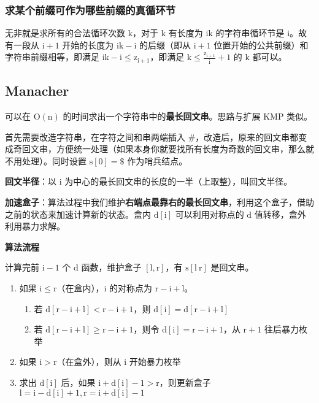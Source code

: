 \documentclass[UTF8]{article}
\begin{document}
\subsubsection{求某个前缀可作为哪些前缀的真循环节}
无非就是求所有的合法循环次数 $\mathrm{k}$，对于 $\mathrm{k}$ 有长度为 $\mathrm{ik}$ 的字符串循环节是 $\mathrm{i}$。故有一段从 $\mathrm{i + 1}$ 开始的长度为 $\mathrm{ik - i}$ 的后缀（即从 $\mathrm{i +1}$ 位置开始的公共前缀）和字符串前缀相等，即满足 $\mathrm{ik - i \le z_{i + 1}}$，即满足 $\mathrm{k \le \frac{z_{i+1}}{i} + 1}$ 的 $\mathrm{k}$ 都可以。


\subsection{Manacher}
可以在 $\mathrm{O(n)}$ 的时间求出一个字符串中的\textbf{最长回文串}。思路与扩展 KMP 类似。

首先需要改造字符串，在字符之间和串两端插入 \#，改造后，原来的回文串都变成奇回文串，方便统一处理（如果本身你就要找所有长度为奇数的回文串，那么就不用处理）。同时设置 $\mathrm{s[0] = \$}$ 作为哨兵结点。

\textbf{回文半径}：以 $\mathrm{i}$ 为中心的最长回文串的长度的一半（上取整），叫回文半径。

\textbf{加速盒子}：算法过程中我们维护\textbf{右端点最靠右的最长回文串}，利用这个盒子，借助之前的状态来加速计算新的状态。盒内 $\mathrm{d[i]}$ 可以利用对称点的 $\mathrm{d}$ 值转移，盒外利用暴力求解。

\noindent \textbf{算法流程}

计算完前 $\mathrm{i - 1}$ 个 $\mathrm{d}$ 函数，维护盒子 $\mathrm{[l, r]}$，有 $\mathrm{s[l ~ r]}$ 是回文串。

\begin{enumerate}
	\item 如果 $\mathrm{i \le r}$（在盒内），$\mathrm{i}$ 的对称点为 $\mathrm{r - i + l}$。		
	\begin{enumerate}
		\item 若 $\mathrm{d[r - i + l] < r - i + 1}$，则 $\mathrm{d[i] = d[r - i +l]}$
		\item 若 $\mathrm{d[r - i + l] \ge r - i + 1}$，则令 $\mathrm{d[i] = r - i + 1}$，从 $\mathrm{r + 1}$ 往后暴力枚举
	\end{enumerate}
	\item 如果 $\mathrm{i > r}$（在盒外），则从 $\mathrm{i}$ 开始暴力枚举
	\item 求出 $\mathrm{d[i]}$ 后，如果 $\mathrm{i + d[i] - 1 > r}$，则更新盒子 $\mathrm{l = i - d[i] + 1, r = i + d[i] - 1}$
\end{enumerate}
\end{document}
